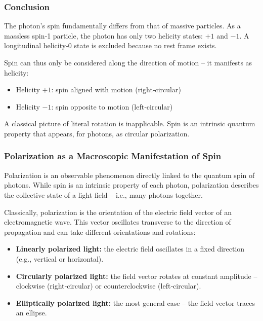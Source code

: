 \subsubsection*{Conclusion}
The photon’s spin fundamentally differs from that of massive particles. As a massless spin‑1 particle, the photon has only two helicity states: $+1$ and $-1$. A longitudinal helicity‑0 state is excluded because no rest frame exists.

\vspace{0.5em}
Spin can thus only be considered along the direction of motion – it manifests as helicity:
\begin{itemize}
	\item Helicity $+1$: spin aligned with motion (right‑circular)
	\item Helicity $-1$: spin opposite to motion (left‑circular)
\end{itemize}
A classical picture of literal rotation is inapplicable. Spin is an intrinsic quantum property that appears, for photons, as circular polarization.

\subsubsection{Polarization as a Macroscopic Manifestation of Spin}

Polarization is an observable phenomenon directly linked to the quantum spin of photons. While spin is an intrinsic property of each photon, polarization describes the collective state of a light field – i.e., many photons together.

\vspace{0.5em}
Classically, polarization is the orientation of the electric field vector of an electromagnetic wave. This vector oscillates transverse to the direction of propagation and can take different orientations and rotations:
\begin{itemize}
	\item \textbf{Linearly polarized light:} the electric field oscillates in a fixed direction (e.g., vertical or horizontal).
	\item \textbf{Circularly polarized light:} the field vector rotates at constant amplitude – clockwise (right‑circular) or counterclockwise (left‑circular).
	\item \textbf{Elliptically polarized light:} the most general case – the field vector traces an ellipse.
\end{itemize}


